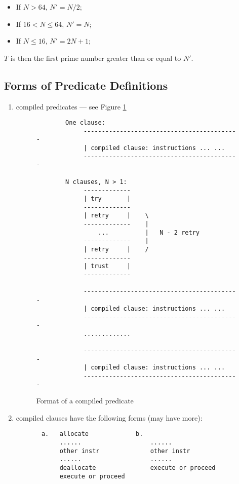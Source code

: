 \documentclass[11pt]{article}
\begin{document}
\begin{itemize}
  \item If $N>64$, $N' = N/2$;
  \item If $16 < N \leq 64$, $N' = N$;
  \item If $N \leq 16$, $N' = 2N+1$;
\end{itemize}

$T$ is then the first prime number greater than or equal to $N'$.


\subsection{Forms of Predicate Definitions}

\begin{enumerate}
    \item compiled predicates --- see Figure \ref{f:cmppred}

\begin{figure}
\begin{verbatim}
        One clause:
             -------------------------------------------
             | compiled clause: instructions ... ...
             -------------------------------------------
   
        N clauses, N > 1:
             -------------
             | try       |
             -------------
             | retry     |    \
             -------------    |
                 ...          |   N - 2 retry
             -------------    |
             | retry     |    /
             -------------
             | trust     |
             -------------

             -------------------------------------------
             | compiled clause: instructions ... ...
             -------------------------------------------
             .............

             -------------------------------------------
             | compiled clause: instructions ... ...
             -------------------------------------------
\end{verbatim}
\caption{Format of a compiled predicate}
\label{f:cmppred}
\end{figure}

    \item compiled clauses have the following forms (may have more):
\begin{verbatim}
       a.   allocate             b.
            ......                   ......
            other instr              other instr
            ......                   ......
            deallocate               execute or proceed
            execute or proceed
\end{verbatim}


\end{enumerate}
\end{document}
